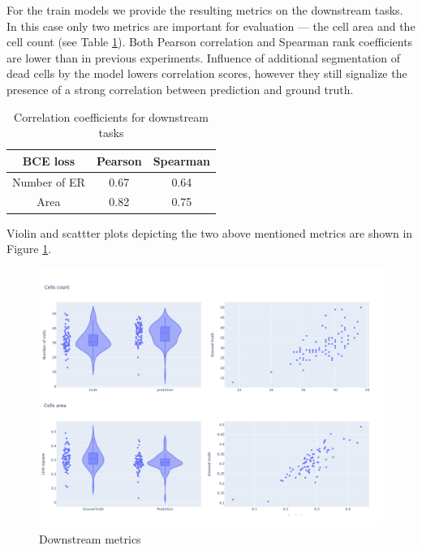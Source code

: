 For the train models we provide the resulting metrics on the downstream tasks. In this case only two metrics are important for evaluation --- the cell area and the cell count (see Table \ref{table:gfp-metrics}). Both Pearson correlation and Spearman rank coefficients are lower than in previous experiments. Influence of additional segmentation of dead cells by the model lowers correlation scores, however they still signalize the presence of a strong correlation between prediction and ground truth. 
\begin{table}[H]
    \centering
    \caption{Correlation coefficients for downstream tasks}
        \begin{adjustbox}{width=0.4\textwidth}
            \begin{tabular}{|c|c|c|}\hline
                BCE loss&Pearson&Spearman
                \\\hline\hline
                Number of ER&0.67&0.64\\\hline
                Area&0.82&0.75\\\hline
            \end{tabular}
            \label{table:gfp-metrics}
        \end{adjustbox}
\end{table}

Violin and scattter plots depicting the two above mentioned metrics are shown in Figure \ref{fig:gfp-bce-metrics}.
\begin{figure}[H]
	\begin{center}
		\includegraphics[width=\linewidth]{bilder/gfp/binary-bce/gfp-bce-metrics.png}
		\caption{Downstream metrics}\label{fig:gfp-bce-metrics}
	\end{center}
\end{figure}